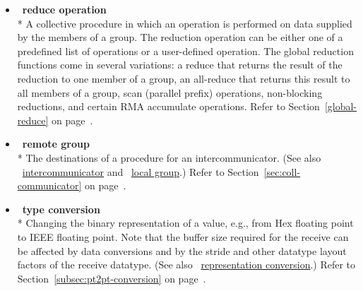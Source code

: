 \begin{itemize}
\label{glossary:reduce_operation}
\item  ~\hypertarget{glossary:reduce_operation}{\textbf{reduce operation}} \\*
A collective procedure in which an operation is performed on data supplied by the members of a group.
The reduction operation can be either one of a predefined list of
operations or a user-defined operation.
The global reduction functions come in several variations: a reduce that
returns the result of the reduction
to one member of a group,
an all-reduce that
returns this result
to all members of a group,
scan (parallel prefix) operations,
non-blocking reductions,
and certain RMA accumulate operations.  
Refer to Section~\ref{global-reduce} on page~\pageref{global-reduce}.

\label{glossary:remote_group}
\item  ~\hypertarget{glossary:remote_group}{\textbf{remote group}} \\*
The destinations of a procedure for an intercommunicator. 
(See also ~\hyperlink{glossary:intercommunicator}{intercommunicator} and
~\hyperlink{glossary:local_group}{local group}.)
Refer to Section~\ref{sec:coll-communicator} on page~\pageref{sec:coll-communicator}.

\label{glossary:representation_conversion}
\item  ~\hypertarget{glossary:representation_conversion}{\textbf{type conversion}} \\*
Changing the binary representation of a value,
e.g., from Hex floating point to IEEE floating point. Note that the buffer size required for the receive can be affected by data conversions and
by the stride and other datatype layout factors of the receive datatype.  
(See also ~\hyperlink{glossary:representation_conversion}{representation conversion}.)
Refer to Section~\ref{subsec:pt2pt-conversion} on page~\pageref{subsec:pt2pt-conversion}.


\end{itemize}
